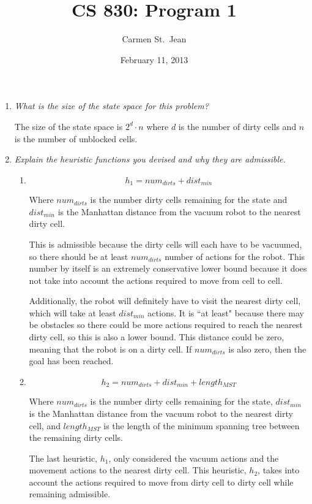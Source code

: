 \documentclass[letterpaper,11pt]{article}
\begin{document}
\title{CS 830: Program 1}
\date{February 11, 2013}
\author{Carmen St.\ Jean}

\maketitle

\begin{enumerate}
\item \emph{What is the size of the state space for this problem?}

The size of the state space is $2^d \cdot n$ where $d$ is the number of dirty cells and $n$ is the number of unblocked cells.

\item \emph{Explain the heuristic functions you devised and why they are admissible.}

\begin{enumerate}
\item $$
h_1 = num_{dirts} + dist_{min}
$$

Where $num_{dirts}$ is the number dirty cells remaining for the state and $dist_{min}$ is the Manhattan distance from the vacuum robot to the nearest dirty cell.

This is admissible because the dirty cells will each have to be vacuumed, so there should be at least $num_{dirts}$ number of actions for the robot.  This number by itself is an extremely conservative lower bound because it does not take into account the actions required to move from cell to cell.

Additionally, the robot will definitely have to visit the nearest dirty cell, which will take at least $dist_{min}$ actions.  It is ``at least" because there may be obstacles so there could be more actions required to reach the nearest dirty cell, so this is also a lower bound.  This distance could be zero, meaning that the robot is on a dirty cell.  If $num_{dirts}$ is also zero, then the goal has been reached.
\item $$
h_2 = num_{dirts} + dist_{min} + length_{MST}
$$

Where $num_{dirts}$ is the number dirty cells remaining for the state, $dist_{min}$ is the Manhattan distance from the vacuum robot to the nearest dirty cell, and $length_{MST}$ is the length of the minimum spanning tree between the remaining dirty cells.

The last heuristic, $h_1$, only considered the vacuum actions and the movement actions to the nearest dirty cell.  This heuristic, $h_2$, takes into account the actions required to move from dirty cell to dirty cell while remaining admissible.


\end{enumerate}
\end{enumerate}
\end{document}
